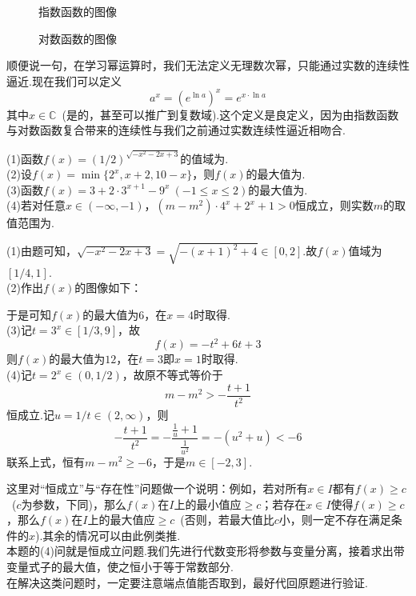 \documentclass[lang=cn, zihao=5]{elegantbook}
\newcommand{\ssb}[1]{\left( #1 \right)}
\newcommand{\C}{\mathbb{C}}
\newcommand{\tk}{\uline{\hspace{4em}}}
\begin{document}
\begin{figure}[h!]
	\centering
	
	\caption{指数函数的图像}
\end{figure}

\begin{figure}[h!]
	\centering
	
	\caption{对数函数的图像}
\end{figure}

顺便说一句，在学习幂运算时，我们无法定义无理数次幂，只能通过实数的连续性逼近.现在我们可以定义$$a^x = \ssb{e ^{\ln a}}^x = e^{x \cdot \ln a}$$
其中$x \in \C$~(是的，甚至可以推广到复数域).这个定义是良定义，因为由指数函数与对数函数复合带来的连续性与我们之前通过实数连续性逼近相吻合.

\begin{example}
	(1)函数$f(x)=\ssb{1/2}^{\sqrt{-x^2-2x+3}}$的值域为\tk . \\
	(2)设$f(x)=\min \{ 2^x,x+2,10-x \}$，则$f(x)$的最大值为\tk . \\
	(3)函数$f(x)=3+2 \cdot 3^{x+1} - 9^x~(-1 \leq x \leq 2)$的最大值为\tk . \\
	(4)若对任意$x \in (-\infty ,-1)$，$(m-m^2) \cdot 4^x + 2^x + 1 >0$恒成立，则实数$m$的取值范围为\tk .
\end{example}
\begin{solution}
	(1)由题可知，$\sqrt{-x^2-2x+3} = \sqrt{-(x+1)^2 + 4} \in [0,2]$.故$f(x)$值域为$[1/4,1]$. \\
	(2)作出$f(x)$的图像如下：
	\begin{figure}[h!]
		\centering
		
	\end{figure}
	于是可知$f(x)$的最大值为$6$，在$x=4$时取得. \\
	(3)记$t=3^x \in [1/3,9]$，故$$f(x) = -t^2 + 6t + 3$$
	则$f(x)$的最大值为$12$，在$t=3$即$x=1$时取得. \\
	(4)记$t=2^x \in (0,1/2)$，故原不等式等价于$$m-m^2 > -\frac{t+1}{t^2}$$恒成立.记$u=1/t \in (2, \infty)$，则$$-\frac{t+1}{t^2} = -\frac{\frac{1}{u}+1}{\frac{1}{u^2}} = -(u^2+u) < -6$$
	联系上式，恒有$m-m^2 \geq -6$，于是$m \in [-2,3]$.
\end{solution}

\begin{remark}
	这里对“恒成立”与“存在性”问题做一个说明：例如，若对所有$x \in I$都有$f(x) \geq c$~($c$为参数，下同)，那么$f(x)$在$I$上的最小值应$\geq c$；若存在$x \in I$使得$f(x) \geq c$，那么$f(x)$在$I$上的最大值应$\geq c$~(否则，若最大值比$c$小，则一定不存在满足条件的$x$).其余的情况可以由此例类推. \\
	本题的(4)问就是恒成立问题.我们先进行代数变形将参数与变量分离，接着求出带变量式子的最大值，使之恒小于等于常数部分. \\
	在解决这类问题时，一定要注意端点值能否取到，最好代回原题进行验证.
\end{remark}
\end{document}
